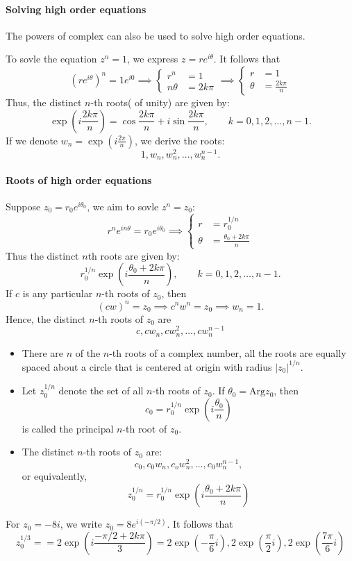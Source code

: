 \paragraph{Solving high order equations}The powers of complex can also be used to solve high order equations.
\begin{example}
To sovle the equation $z^n=1$, we express $z = re^{i\theta}$. It follows that
\[
(re^{i\theta})^n = 1e^{i0}\implies
\left\{
\begin{aligned}
r^n&=1\\
n\theta&=2k\pi
\end{aligned}\right.
\implies
\left\{
\begin{aligned}
r&=1\\
\theta&=\frac{2k\pi}{n}
\end{aligned}\right.
\]
Thus, the distinct $n$-th roots( of unity) are given by:
\[
\exp(i\frac{2k\pi}{n}) = \cos\frac{2k\pi}{n} + i\sin\frac{2k\pi}{n},\qquad
k=0,1,2,\dots,n-1.
\]
If we denote $w_n=\exp(i\frac{2\pi}{n})$, we derive the roots:
\[
1,w_n,w_n^2,\dots,w_n^{n-1}.
\]
\end{example}
\paragraph{Roots of high order equations}
Suppose $z_0=r_0e^{i\theta_0}$, we aim to sovle $z^n = z_0$:
\[
r^ne^{in\theta} = r_0e^{i\theta_0}\implies
\left\{
\begin{aligned}
r&=r_0^{1/n}\\
\theta&=\frac{\theta_0+2k\pi}{n}
\end{aligned}
\right.
\]
Thus the distinct $n$th roots are given by:
\[
r_0^{1/n}\exp(i\frac{\theta_0+2k\pi}{n}),\qquad
k=0,1,2,\dots,n-1.
\]
If $c$ is any particular $n$-th roots of $z_0$, then
\[
(cw)^n=z_0\implies
c^nw^n=z_0\implies w_n=1.
\]
Hence, the distinct $n$-th roots of $z_0$ are
\[
c,cw_n,cw_n^2,\dots,cw_n^{n-1}
\]
\begin{remark}
\begin{itemize}
\item
There are $n$ of the $n$-th roots of a complex number, all the roots are equally spaced about a circle that is centered at origin with radius $|z_0|^{1/n}$.
\item
Let $z_0^{1/n}$ denote the set of all $n$-th roots of $z_0$. If $\theta_0=\mbox{Arg}z_0$, then
\[
c_0=r_0^{1/n}\exp(i\frac{\theta_0}{n})
\]
is called the principal $n$-th root of $z_0$.
\item
The distinct $n$-th roots of $z_0$ are:
\[
c_0,c_0w_n,c_ow_n^2,\dots,c_0w_n^{n-1},
\]
or equivalently,
\[
z_0^{1/n} = r_0^{1/n}\exp(i\frac{\theta_0+2k\pi}{n})
\]
\end{itemize}

\end{remark}

\begin{example}
For $z_0= -8i$, we write $z_0=8e^{i(-\pi/2)}$. It follows that
\[
z_0^{1/3} = =2\exp(i\frac{-\pi/2 + 2k\pi}{3}) = 2\exp(-\frac{\pi}{6}i),2\exp(\frac{\pi}{2}i),2\exp(\frac{7\pi}{6}i)
\]

\end{example}

